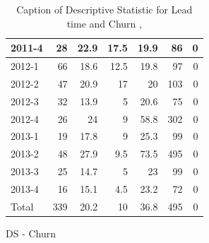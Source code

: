 \documentclass[UKenglish]{ifimaster}  %
\begin{document}
\begin{appendices}
\begin{table}[!htbp]
\begin{adjustwidth}{-2.5cm}{}
\begin{subfigure}[b]{0.3\textwidth}
{\begin{tabular}{ | l | r | r | r | r | r | r | }
 2011-4  & 28 & 22.9 & 17.5 & 19.9 & 86 & 0\\ \hline
 2012-1  & 66 & 18.6 & 12.5 & 19.8 & 97 & 0\\ \hline
 2012-2  & 47 & 20.9 & 17 & 20 & 103 & 0\\ \hline
 2012-3  & 32 & 13.9 & 5 & 20.6 & 75 & 0\\ \hline
 2012-4  & 26 & 24 & 9 & 58.8 & 302 & 0\\ \hline
 2013-1  & 19 & 17.8 & 9 & 25.3 & 99 & 0\\ \hline
 2013-2  & 48 & 27.9 & 9.5 & 73.5 & 495 & 0\\ \hline
 2013-3  & 25 & 14.7 & 5 & 23 & 99 & 0\\ \hline
 2013-4  & 16 & 15.1 & 4.5 & 23.2 & 72 & 0\\ \hline
 Total  & 339 & 20.2 & 10 & 36.8 & 495 & 0\\ \hline
\end{tabular}
}
\caption{DS - Churn}
 \label{DS:Churn:1}
\end{subfigure}
\end{adjustwidth}
\caption[Optional caption for list of figures]{Caption of Descriptive Statistic for Lead time and Churn  , }
\label{DS:1:3} %
\end{table}


\end{appendices}
\end{document}
